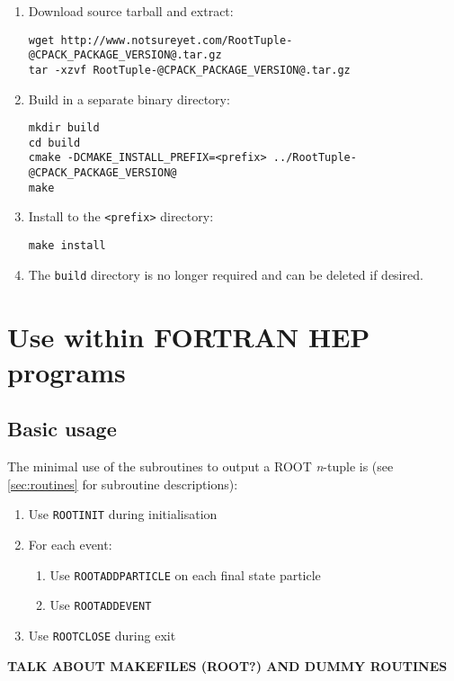 \documentclass[a4paper,12pt]{article}
\begin{document}
\begin{enumerate}
    \item Download source tarball and extract:\begin{verbatim}
wget http://www.notsureyet.com/RootTuple-@CPACK_PACKAGE_VERSION@.tar.gz
tar -xzvf RootTuple-@CPACK_PACKAGE_VERSION@.tar.gz\end{verbatim}
    \item Build in a separate binary directory:\begin{verbatim}
mkdir build
cd build
cmake -DCMAKE_INSTALL_PREFIX=<prefix> ../RootTuple-@CPACK_PACKAGE_VERSION@
make\end{verbatim}
    \item Install to the \verb|<prefix>| directory:\begin{verbatim}
make install\end{verbatim}
    \item The \verb|build| directory is no longer required and can be deleted if desired.
\end{enumerate}

\section{Use within FORTRAN HEP programs}
\label{sec:usage}
\subsection{Basic usage}
The minimal use of the subroutines to output a ROOT \emph{n}-tuple is (see \textsection\ref{sec:routines} for subroutine descriptions):
\begin{enumerate}
    \item Use \verb|ROOTINIT| during initialisation
    \item For each event:
    \begin{enumerate}
        \item Use \verb|ROOTADDPARTICLE| on each final state particle
        \item Use \verb|ROOTADDEVENT|
    \end{enumerate}
    \item Use \verb|ROOTCLOSE| during exit
\end{enumerate}

\uppercase{\textbf{Talk about makefiles (ROOT?) and dummy routines}}
\end{document}
